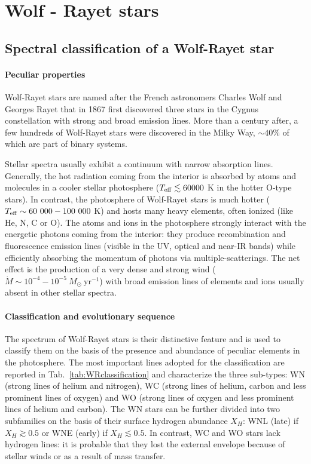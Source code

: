 \documentclass[a4paper,titlepage]{book}     	%
\newcommand{\sun}{\ensuremath{_\odot}}
\newcommand{\mdot}{\ensuremath{\dot{M}}}
\newcommand{\msun}{\ensuremath{M\sun}}
\newcommand{\yr}{\text{yr}}
\begin{document}
\section{Wolf - Rayet stars}
\subsection{Spectral classification of a Wolf-Rayet star}\label{subsec:WRclassification}
\paragraph{Peculiar properties} Wolf-Rayet stars are named after the French astronomers Charles Wolf and Georges Rayet that in 1867 first discovered three stars in the Cygnus constellation with strong and broad emission lines. More than a century after, a few hundreds of Wolf-Rayet stars were discovered in the Milky Way, $\sim 40 \%$ of which are part of binary systems.

Stellar spectra usually exhibit a continuum with narrow absorption lines. Generally, the hot radiation coming from the interior is absorbed by atoms and molecules in a cooler stellar photosphere ($T_{\rm eff} \lesssim 60 000$ K in the hotter O-type stars). In contrast, the photosphere of Wolf-Rayet stars is much hotter ($T_{\rm eff} \sim 60~000 - 100~000$ K) and hosts many heavy elements, often ionized (like He, N, C or O). The atoms and ions in the photosphere strongly interact with the energetic photons coming from the interior: they produce recombination and fluorescence emission lines (visible in the UV, optical and near-IR bands) while efficiently absorbing the momentum of photons via multiple-scatterings. The net effect is the production of a very dense and strong wind ($\mdot \sim 10^{-4}-10^{-5}~\msun~\yr^{-1}$) with broad emission lines of elements and ions usually absent in other stellar spectra.

\paragraph{Classification and evolutionary sequence}The spectrum of Wolf-Rayet stars is their distinctive feature and is used to classify them on the basis of the presence and abundance of peculiar elements in the photosphere. The most important lines adopted for the classification are reported in Tab.\ \ref{tab:WRclassification} and characterize the three sub-types: WN (strong lines of helium and nitrogen), WC (strong lines of helium, carbon and less prominent lines of oxygen) and WO (strong lines of oxygen and less prominent lines of helium and carbon). The WN stars can be further divided into two subfamilies on the basis of their surface hydrogen abundance $X_H$: WNL (late) if $X_H \gtrsim 0.5$ or WNE (early) if $X_H \lesssim 0.5$. In contrast, WC and WO stars lack hydrogen lines: it is probable that they lost the external envelope because of stellar winds or as a result of mass transfer.  
\end{document}
